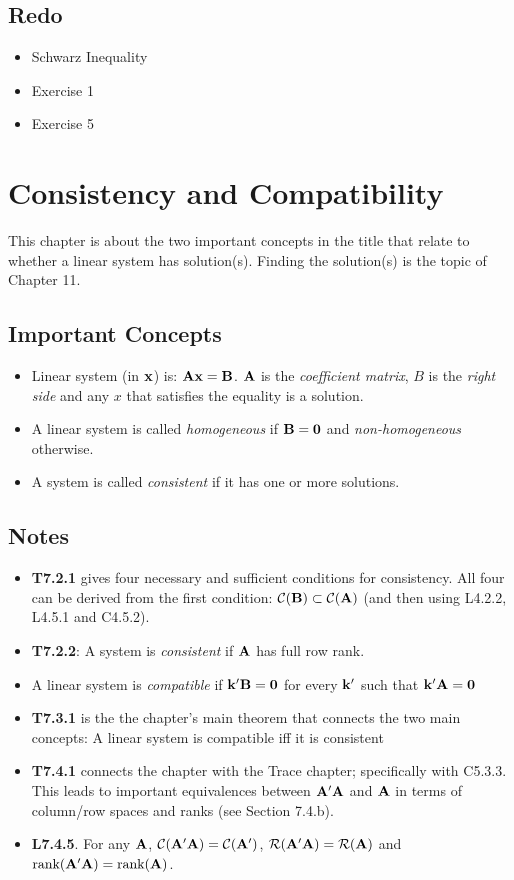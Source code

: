 \documentclass[a4paper, oneside]{book}
\begin{document}
\section*{Redo}
\begin{itemize}
\item Schwarz Inequality
\item Exercise 1
\item Exercise 5
\end{itemize}

\chapter{Consistency and Compatibility}
This chapter is about the two important concepts in the title that relate to whether a linear system has solution(s). Finding the solution(s) is the topic of Chapter 11.

\section*{Important Concepts}
\begin{itemize}
\item Linear system (in $\mathbf{x}$) is: $\mathbf{Ax=B}$. $\mathbf A$ is the \textit{coefficient matrix}, $B$ is the \textit{right side} and any $x$ that satisfies the equality is a solution. 
\item A linear system is called \textit{homogeneous} if $\mathbf{B=0}$ and \textit{non-homogeneous} otherwise.
\item A system is called \textit{consistent} if it has one or more solutions.
\end{itemize}

\section*{Notes}
\begin{itemize}
\item \textbf{T7.2.1} gives four necessary and sufficient conditions for consistency. All four can be derived from the first condition: $\mathcal{C}(\mathbf{B}) \subset \mathcal{C}(\mathbf{A})$ (and then using L4.2.2, L4.5.1 and C4.5.2).
\item \textbf{T7.2.2}: A system is \textit{consistent} if $\mathbf{A}$ has full row rank.
\item A linear system is \textit{compatible} if $\mathbf{k'B=0}$ for every $\mathbf k'$ such that $\mathbf{k'A=0}$
\item \textbf{T7.3.1} is the the chapter's main theorem that connects the two main concepts: A linear system is compatible iff it is consistent
\item \textbf{T7.4.1} connects the chapter with the Trace chapter; specifically with C5.3.3. This leads to important equivalences between $\mathbf{A'A}$ and $\mathbf A$ in terms of column/row spaces and ranks (see Section 7.4.b).
\item \textbf{L7.4.5}. For any $\mathbf{A}$, $\mathcal{C}(\mathbf{A'A})=\mathcal{C}(\mathbf{A}')$, $\mathcal{R}(\mathbf{A'A})=\mathcal{R}(\mathbf{A})$ and $\text{rank}(\mathbf{A'A})=\text{rank}(\mathbf{A})$.
\end{itemize}
\end{document}
